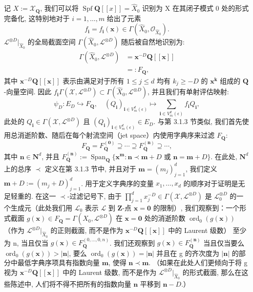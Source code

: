 记 \(X := \mathcal{X}_{\mathbf{Q}}\), 我们可以将 \(\operatorname{Spf} \mathbf{Q}[\![x]\!] = \widehat{X}_0\) 识别为 X 在其闭子模式 0 处的形式完备化, 
这特别地对于 \(i = 1, \dots, m\) 给出了元素
\[ f_{\mathbf{i}} = f_{\mathbf{i}}(\mathbf{x}) \in \Gamma(\widehat{X}_0, \mathcal{O}_{\widehat{X}_0}). \]
\(\mathcal{L}^{\otimes D}|_{\widehat{X}_0}\) 的全局截面空间 \(\Gamma\left(\widehat{X}_0, \mathcal{L}^{\otimes D}\right)\) 随后被自然地识别为:
\[
\begin{aligned}
\Gamma\left(\widehat{X}_0, \mathcal{L}^{\otimes D}\right) &= \mathbf{x}^{-D}\mathbf{Q}[\![\mathbf{x}]\!] \\
&=: F_{\mathbf{Q}},
\end{aligned}
\]
其中 \(\mathbf{x}^{-D}\mathbf{Q}[\![\mathbf{x}]\!]\) 表示由满足对于所有 \(1 \leq j \leq d\) 均有 \(k_j \geq -D\) 
的 \(\mathbf{x}^{\mathbf{k}}\) 组成的 \(\mathbf{Q}\)-向量空间. 
因此 \(f_{\mathbf{i}} \Gamma(\mathcal{X}, \mathcal{L}^{\otimes D}) \subset \Gamma(\widehat{X}_0, \mathcal{L}^{\otimes D})\), 
并且我们有单射评估映射:
\[ \psi_D: E_D \hookrightarrow F_{\mathbf{Q}}, \quad (Q_{\mathbf{i}})_{\mathbf{i} \in V_m^d(\epsilon)} \mapsto \sum_{\mathbf{i} \in V_m^d(\epsilon)} f_{\mathbf{i}} Q_{\mathbf{i}}, \]
此处的 \(Q_{\mathbf{i}} \in \Gamma(\mathcal{X}, \mathcal{L}^{\otimes D})\) 且 \((Q_{\mathbf{i}})_{\mathbf{i} \in V_m^d(\epsilon)} \in E_D\). 
与第 3.1.3 节类似, 我们首先使用总消逝阶数、随后在每个射流空间（jet space）内使用字典序来过滤 \(F_{\mathbf{Q}}\):
\[ F_{\mathbf{Q}} = F_{\mathbf{Q}}^{(\mathbf{0})} \supseteq \cdots \supseteq F_{\mathbf{Q}}^{(\mathbf{n})} \supseteq \cdots, \]
其中 \(\mathbf{n} \in \mathbf{N}^d\), 并且 \(F_{\mathbf{Q}}^{(\mathbf{n})} := \operatorname{Span}_{\mathbf{Q}}\{\mathbf{x}^{\mathbf{m}} : \mathbf{n} \prec \mathbf{m} + D \text{ 或 } \mathbf{n} = \mathbf{m} + D\}\). 
在此处, \(\mathbf{N}^d\) 上的总序 \(\prec\) 定义在第 3.1.3 节中, 并且对于 \(\mathbf{m} = (m_j)_{j=1}^d\), 
我们定义 \(\mathbf{m} + D := (m_j + D)_{j=1}^d\). 
用于定义字典序的变量 \(x_1, \ldots, x_d\) 的顺序对于证明是无足轻重的. 
在这一 \(\prec\)-过滤记号下, 由于 \(\prod_{j=1}^d x_j^{-D} \in \Gamma(\mathcal{X}, \mathcal{L}^{\otimes D})\) 
是 \(\mathcal{L}_0^{\otimes D}\) 的一个生成元（此处我们用 \(\mathcal{L}_0\) 表示 \(\mathcal{L}\) 到 \(\mathbf{Z}\)-点 \(\mathbf{x} = \mathbf{0}\) 的限制）, 
我们观察到：一个形式截面 \(g(\mathbf{x}) \in F_{\mathbf{Q}} = \Gamma(\widehat{X}_0, \mathcal{L}^{\otimes D})\) 
在 \(\mathbf{x} = \mathbf{0}\) 处的消逝阶数 \(\operatorname{ord}_0(g(\mathbf{x}))\) （作为 \(\mathcal{L}^{\otimes D}|_{\widehat{X}_0}\) 的正则截面, 
而不是作为 \(\mathbf{x}^{-D}\mathbf{Q}[\![\mathbf{x}]\!]\) 中的 Laurent 级数） 
至少为 n, 当且仅当 \(g(\mathbf{x}) \in F_{\mathbf{Q}}^{(0,\ldots,0,n)}\). 
我们还观察到 \(g(\mathbf{x}) \in F_{\mathbf{Q}}^{(\mathbf{n})}\) 当且仅当要么 \(\operatorname{ord}_0(g(\mathbf{x})) > |\mathbf{n}|\), 
要么 \(\operatorname{ord}_0(g(\mathbf{x})) = |\mathbf{n}|\) 并且在 g 的齐次度为 \(|\mathbf{n}|\) 的部分中最低字典序项具有指数向量 \(\mathbf{m}\), 
使得 \(\mathbf{n} \prec \mathbf{m}\). 
（如果在此处人们更倾向于将 g 视为 \(\mathbf{x}^{-D}\mathbf{Q}[\![\mathbf{x}]\!]\) 中的 Laurent 级数, 
而不是作为 \(\mathcal{L}^{\otimes D}|_{\widehat{X}_0}\) 的形式截面, 
那么在这些陈述中, 人们将不得不把所有的指数向量 \(\mathbf{n}\) 平移到 \(\mathbf{n} - D\).）

